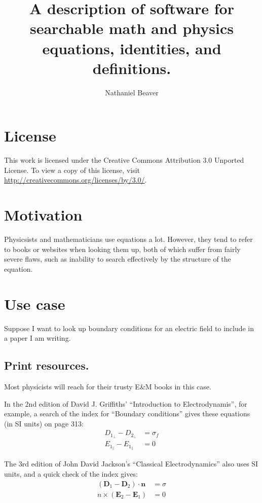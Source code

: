 \documentclass[12pt,letterpaper]{article}
\author{Nathaniel Beaver}
\title{A description of software for searchable math and physics equations, identities, and definitions.}
\begin{document}
\maketitle

\section{License}

This work is licensed under the Creative Commons Attribution 3.0 Unported License. To view a copy of this license, visit \url{http://creativecommons.org/licenses/by/3.0/}.

\section{Motivation}

Physicsists and mathematicians use equations a lot. However, they tend to refer to books or websites when looking them up, both of which suffer from fairly severe flaws, such as inability to search effectively by the structure of the equation.

\section{Use case}

Suppose I want to look up boundary conditions for an electric field to include in a paper I am writing.

\subsection{Print resources.}

Most physicists will reach for their trusty E\&M books in this case.

In the 2nd edition of David J. Griffiths' ``Introduction to Electrodynamis'', for example, a search of the index for ``Boundary conditions'' gives these equations (in SI units) on page 313:
\begin{align*}
D_{1_\bot} - D_{2_\bot} &= \sigma_f \\
E_{1_\parallel} - E_{1_\parallel} &= 0
\end{align*}

The 3rd edition of John David Jackson's ``Classical Electrodynamics'' also uses SI units, and a quick check of the index gives:
\begin{align*}
(\mathbf{D}_1 - \mathbf{D}_2)\cdot \mathbf{n} &= \sigma \\
n \times (\mathbf{E}_2 - \mathbf{E}_1) &= 0
\end{align*}
\end{document}
